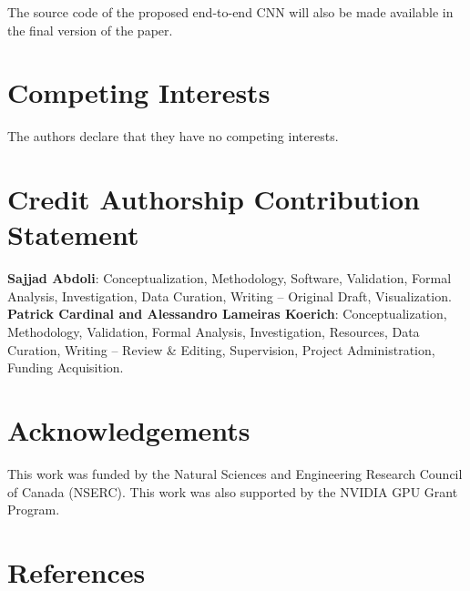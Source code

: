 \documentclass[preprint,final,12pt]{elsarticle}
\begin{document}
The source code of the proposed end-to-end CNN will also be made available in the final version of the paper.

\section*{Competing Interests}
The authors declare that they have no competing interests.


\section*{Credit Authorship Contribution Statement}
\textbf{Sajjad Abdoli}: Conceptualization, Methodology, Software, Validation, Formal Analysis, Investigation, Data Curation, Writing – Original Draft, Visualization. \textbf{Patrick Cardinal and Alessandro Lameiras Koerich}: Conceptualization, Methodology, Validation, Formal Analysis, Investigation, Resources, Data Curation, Writing – Review \& Editing, Supervision, Project Administration, Funding Acquisition. 

\section*{Acknowledgements}
This work was funded by the Natural Sciences and Engineering Research Council of Canada (NSERC). This work was also supported by the NVIDIA GPU Grant Program.



\section*{References}


\end{document}
